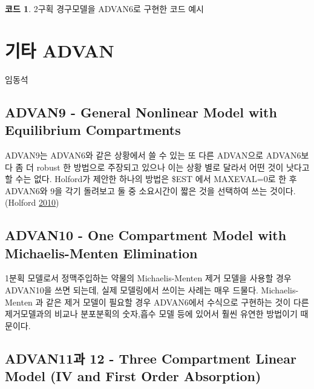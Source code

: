 \documentclass[
  10pt,
  krantz2,
  a4paper]{krantz}
\theoremstyle{definition}
\theoremstyle{definition}
\newtheorem{example}{코드}[chapter]
\theoremstyle{definition}
\theoremstyle{remark}
\begin{document}
\begin{example}
\protect\hypertarget{exm:advan6-example}{}{\label{exm:advan6-example} }2구획 경구모델을 ADVAN6로 구현한 코드 예시
\end{example}

\hypertarget{newer-advan}{%
\chapter{기타 ADVAN}\label{newer-advan}}

임동석

\hypertarget{advan9---general-nonlinear-model-with-equilibrium-compartments}{%
\section{ADVAN9 - General Nonlinear Model with Equilibrium Compartments}\label{advan9---general-nonlinear-model-with-equilibrium-compartments}}

ADVAN9는 ADVAN6와 같은 상황에서 쓸 수 있는 또 다른 ADVAN으로 ADVAN6보다 좀 더 robust 한 방법으로 주장되고 있으나 이는 상황 별로 달라서 어떤 것이 낫다고 할 수는 없다. Holford가 제안한 하나의 방법은 \$EST 에서 MAXEVAL=0로 한 후 ADVAN6와 9을 각기 돌려보고 둘 중 소요시간이 짧은 것을 선택하여 쓰는 것이다. (Holford \protect\hyperlink{ref-nickholford}{2010})

\hypertarget{advan10---one-compartment-model-with-michaelis-menten-elimination}{%
\section{ADVAN10 - One Compartment Model with Michaelis-Menten Elimination}\label{advan10---one-compartment-model-with-michaelis-menten-elimination}}

1분획 모델로서 정맥주입하는 약물의 Michaelis-Menten 제거 모델을 사용할 경우 ADVAN10을 쓰면 되는데, 실제 모델링에서 쓰이는 사례는 매우 드물다. Michaelis-Menten 과 같은 제거 모델이 필요할 경우 ADVAN6에서 수식으로 구현하는 것이 다른 제거모델과의 비교나 분포분획의 숫자,흡수 모델 등에 있어서 훨씬 유연한 방법이기 때문이다.

\hypertarget{advan11uxacfc-12---three-compartment-linear-model-iv-and-first-order-absorption}{%
\section{ADVAN11과 12 - Three Compartment Linear Model (IV and First Order Absorption)}\label{advan11uxacfc-12---three-compartment-linear-model-iv-and-first-order-absorption}}
\end{document}
